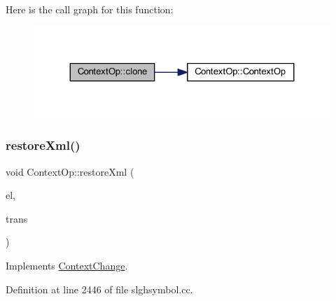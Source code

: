 Here is the call graph for this function\+:
\nopagebreak
\begin{figure}[H]
\begin{center}
\leavevmode
\includegraphics[width=324pt]{class_context_op_a157a525c2c9db4f2cd01cb0dc579963e_cgraph}
\end{center}
\end{figure}
\mbox{\label{class_context_op_ad116f3dd9045a92b84ae10eefaf74f04}} 
\subsubsection{\texorpdfstring{restoreXml()}{restoreXml()}}
{\footnotesize\ttfamily void Context\+Op\+::restore\+Xml (\begin{DoxyParamCaption}\item[{const \mbox{\hyperlink{class_element}{Element}} $\ast$}]{el,  }\item[{\mbox{\hyperlink{class_sleigh_base}{Sleigh\+Base}} $\ast$}]{trans }\end{DoxyParamCaption})\hspace{0.3cm}{\ttfamily [virtual]}}



Implements \mbox{\hyperlink{class_context_change_a95a77fd92582d479472c46e672262248}{Context\+Change}}.



Definition at line 2446 of file slghsymbol.\+cc.


